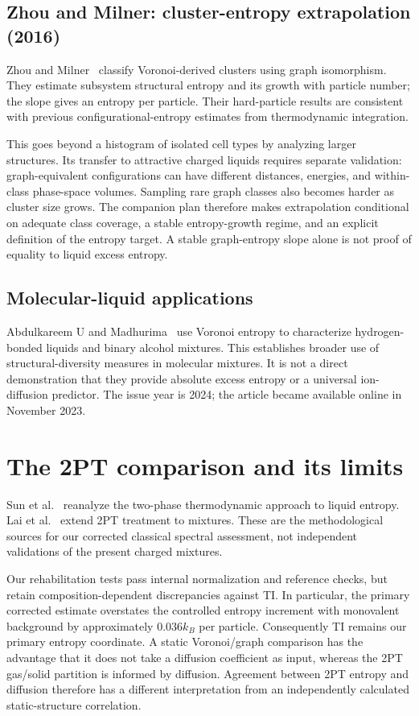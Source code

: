 \documentclass[11pt,a4paper]{article}
\begin{document}
\subsection{Zhou and Milner: cluster-entropy extrapolation (2016)}
Zhou and Milner~\cite{Zhou2016} classify Voronoi-derived clusters using graph
isomorphism. They estimate subsystem structural entropy and its growth with
particle number; the slope gives an entropy per particle. Their hard-particle
results are consistent with previous configurational-entropy estimates from
thermodynamic integration.

This goes beyond a histogram of isolated cell types by analyzing larger
structures. Its transfer to attractive charged liquids requires separate
validation: graph-equivalent configurations can have different distances,
energies, and within-class phase-space volumes. Sampling rare graph classes
also becomes harder as cluster size grows. The companion plan therefore
makes extrapolation conditional on adequate class coverage, a stable
entropy-growth regime, and an explicit definition of the entropy target.
A stable graph-entropy slope alone is not proof of equality to liquid excess
entropy.

\subsection{Molecular-liquid applications}
Abdulkareem U and Madhurima~\cite{Abdulkareem2024} use Voronoi entropy to
characterize hydrogen-bonded liquids and binary alcohol mixtures. This
establishes broader use of structural-diversity measures in molecular
mixtures. It is not a direct demonstration that they provide absolute excess
entropy or a universal ion-diffusion predictor. The issue year is 2024;
the article became available online in November 2023.

\section{The 2PT comparison and its limits}
Sun et al.~\cite{Sun2017} reanalyze the two-phase thermodynamic approach to
liquid entropy. Lai et al.~\cite{Lai2012} extend 2PT treatment to mixtures.
These are the methodological sources for our corrected classical spectral
assessment, not independent validations of the present charged mixtures.

Our rehabilitation tests pass internal normalization and reference checks,
but retain composition-dependent discrepancies against TI. In particular,
the primary corrected estimate overstates the controlled entropy increment
with monovalent background by approximately $0.036k_B$ per particle.
Consequently TI remains our primary entropy coordinate. A static Voronoi/graph
comparison has the advantage that it does not take a diffusion coefficient
as input, whereas the 2PT gas/solid partition is informed by diffusion.
Agreement between 2PT entropy and diffusion therefore has a different
interpretation from an independently calculated static-structure correlation.
\end{document}
